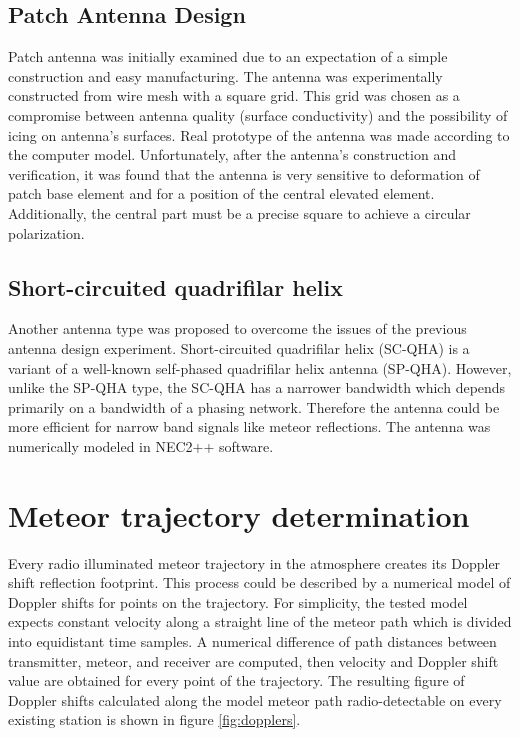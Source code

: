 \documentclass[twoside]{ctuthesis}
\theoremstyle{plain}
\theoremstyle{definition}
\theoremstyle{note}
\begin{document}
\subsection{Patch Antenna Design }

Patch antenna was initially examined due to an expectation of a simple construction and easy manufacturing. The antenna was experimentally constructed from wire mesh with a square grid. This grid was chosen as a compromise between antenna quality (surface conductivity)  and the possibility of icing on antenna’s surfaces. Real prototype of the antenna was made according to the computer model. Unfortunately, after the antenna’s construction and verification, it was found that the antenna is very sensitive to deformation of patch base element and for a position of the central elevated element. Additionally, the central part must be a precise square to achieve a circular polarization. 

\subsection{Short-circuited quadrifilar helix}

Another antenna type was proposed to overcome the issues of the previous antenna design experiment.  Short-circuited quadrifilar helix (SC-QHA) is a variant of a well-known self-phased quadrifilar helix antenna (SP-QHA). However, unlike the SP-QHA type, the  SC-QHA has a narrower bandwidth which depends primarily on a bandwidth of a phasing network. Therefore the antenna could be more efficient for narrow band signals like meteor reflections.  The antenna was numerically modeled in NEC2++ software.

\section{Meteor trajectory determination}

Every radio illuminated meteor trajectory in the atmosphere creates its Doppler shift reflection footprint.  This process could be described by a numerical model of Doppler shifts for points on the trajectory. For simplicity, the tested model expects constant velocity along a straight line of the meteor path which is divided into equidistant time samples. A numerical difference of path distances between transmitter, meteor, and receiver are computed, then velocity and Doppler shift value are obtained for every point of the trajectory. 
The resulting figure of Doppler shifts calculated along the model meteor path radio-detectable on every existing station is shown in figure \ref{fig:dopplers}. 
\end{document}
